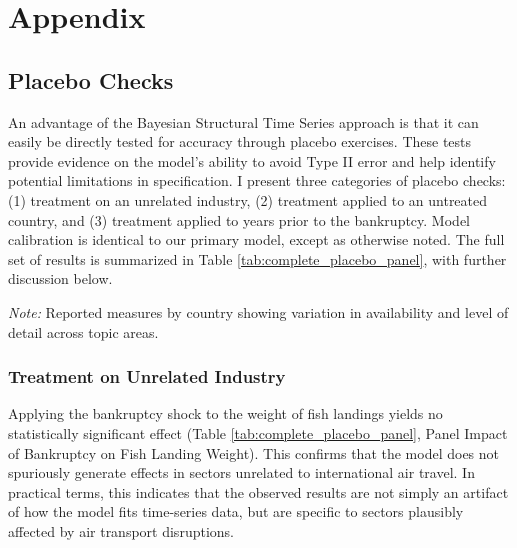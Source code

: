 \documentclass[12pt]{article}
\begin{document}
\section{Appendix}\label{sec:Appendix}
\subsection{Placebo Checks}\label{sec:appendix_placebos}
An advantage of the Bayesian Structural Time Series approach is that it can easily be directly tested for accuracy through placebo exercises. These tests provide evidence on the model’s ability to avoid Type II error and help identify potential limitations in specification. I present three categories of placebo checks: (1) treatment on an unrelated industry, (2) treatment applied to an untreated country, and (3) treatment applied to years prior to the bankruptcy. Model calibration is identical to our primary model, except as otherwise noted. The full set of results is summarized in Table \ref{tab:complete_placebo_panel}, with further discussion below.


\begin{table}
  \caption{Placebo Counterfactual Analysis}\label{tab:complete_placebo_panel}
\resizebox{\textwidth}{!}{%
\centering
  
  }
  \begin{tablenotes}
    \footnotesize
    \item \textit{Note:} Reported measures by country showing variation in availability and level of detail across topic areas.
  \end{tablenotes}
\end{table}

\subsubsection{Treatment on Unrelated Industry}\label{sec:Placebo1}

Applying the bankruptcy shock to the weight of fish landings yields no statistically significant effect (Table \ref{tab:complete_placebo_panel}, Panel Impact of Bankruptcy on Fish Landing Weight). This confirms that the model does not spuriously generate effects in sectors unrelated to international air travel. In practical terms, this indicates that the observed results are not simply an artifact of how the model fits time-series data, but are specific to sectors plausibly affected by air transport disruptions.
\end{document}
